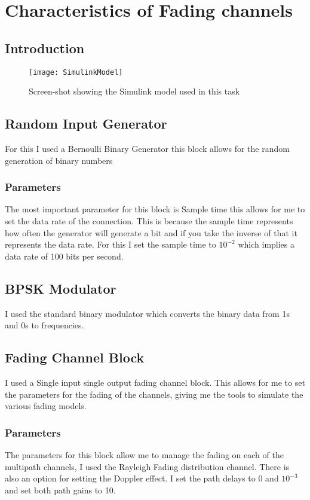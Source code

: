 \section{Characteristics of Fading channels}{
	\subsection{Introduction}{
		\begin{figure}
			\centering
			\texttt{[image: SimulinkModel]}
			\caption{Screen-shot showing the Simulink model used in this task}
			\label{img:SimulinkModel}
		\end{figure}
	}
	\subsection{Random Input Generator}
	{
		For this I used a Bernoulli Binary Generator this block allows for the random generation of binary numbers
		\subsubsection{Parameters}
		{
			The most important parameter for this block is Sample time this allows for me to set the data rate of the connection. This is because the sample time represents how often the generator will generate a bit and if you take the inverse of that it represents the data rate. For this I set the sample time to $10^{-2}$ which implies a data rate of 100 bits per second.
		}
	}
	\subsection{BPSK Modulator}
	{
		I used the standard binary modulator which converts the binary data from 1s and 0s to frequencies.
	}
	\subsection{Fading Channel Block}
	{
		I used a Single input single output fading channel block. This allows for me to set the parameters for the fading of the channels, giving me the tools to simulate the various fading models.
		\subsubsection{Parameters}
		{
			The parameters for this block allow me to manage the fading on each of the multipath channels, I used the Rayleigh Fading distribution channel. There is also an option for setting the Doppler effect. I set the path delays to 0 and $10^{-3}$ and set both path gains to 10. 
		}
	}
}
